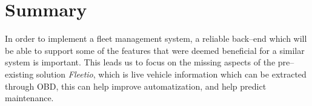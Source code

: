 \section{Summary}\label{sub:Assessment}
In order to implement a fleet management system, a reliable back--end which will be able to support some of the features that were deemed beneficial for a similar system is important.
This leads us to focus on the missing aspects of the pre--existing solution \textit{Fleetio}, which is live vehicle information which can be extracted through \ac{OBD}, this can help improve automatization, and help predict maintenance.
